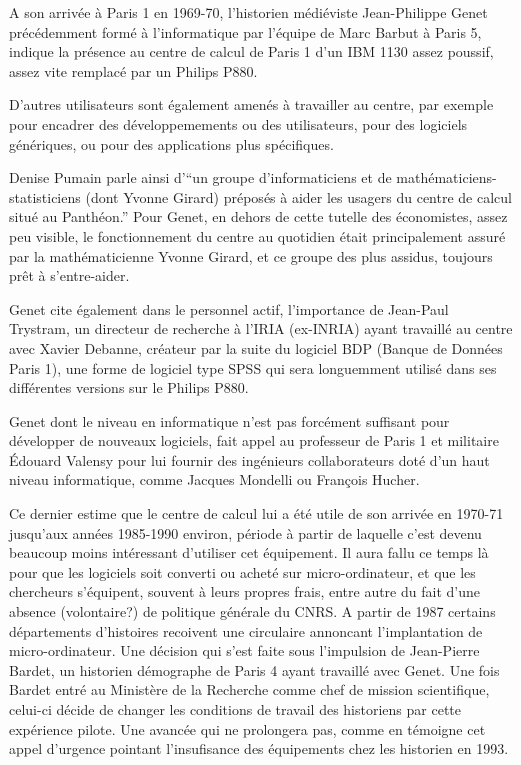 A son arrivée à Paris 1 en 1969-70, l'historien médiéviste Jean-Philippe Genet précédemment formé à l'informatique par l'équipe de Marc Barbut à Paris 5, indique la présence au centre de calcul de Paris 1 d'un IBM 1130 assez poussif, assez vite remplacé par un Philips P880.

D'autres utilisateurs sont également amenés à travailler au centre, par exemple pour encadrer des développemements ou des utilisateurs, pour des logiciels génériques, ou pour des applications plus spécifiques.

Denise Pumain parle ainsi d'\enquote{un groupe d'informaticiens et de mathématiciens-statisticiens (dont Yvonne Girard) préposés à aider les usagers du centre de calcul situé au Panthéon.} Pour Genet, en dehors de cette tutelle des économistes, assez peu visible, le fonctionnement du centre au quotidien était principalement assuré par la mathématicienne Yvonne Girard, et ce groupe des plus assidus, toujours prêt à s'entre-aider.

Genet cite également dans le personnel actif, l'importance de Jean-Paul Trystram, un directeur de recherche à l'IRIA (ex-INRIA) ayant travaillé au centre avec Xavier Debanne, créateur par la suite du logiciel BDP (Banque de Données Paris 1), une forme de logiciel type SPSS qui sera longuemment utilisé dans ses différentes versions sur le Philips P880.

Genet dont le niveau en informatique n'est pas forcément suffisant pour développer de nouveaux logiciels, fait appel au professeur de Paris 1 et militaire Édouard Valensy pour lui fournir des ingénieurs collaborateurs doté d'un haut niveau informatique, comme Jacques Mondelli ou François Hucher. 

Ce dernier estime que le centre de calcul lui a été utile de son arrivée en 1970-71 jusqu'aux années 1985-1990 environ, période à partir de laquelle c'est devenu beaucoup moins intéressant d'utiliser cet équipement. Il aura fallu ce temps là pour que les logiciels soit converti ou acheté sur micro-ordinateur, et que les chercheurs s'équipent, souvent à leurs propres frais, entre autre du fait d'une absence (volontaire?) de politique générale du CNRS. A partir de 1987 certains départements d'histoires recoivent une circulaire annoncant l'implantation de micro-ordinateur. Une décision qui s'est faite sous l'impulsion de Jean-Pierre Bardet, un historien démographe de Paris 4 ayant travaillé avec Genet. Une fois Bardet entré au Ministère de la Recherche comme chef de mission scientifique, celui-ci décide de changer les conditions de travail des historiens par cette expérience pilote. Une avancée qui ne prolongera pas, comme en témoigne cet appel d'urgence pointant l'insufisance des équipements chez les historien en 1993. %


